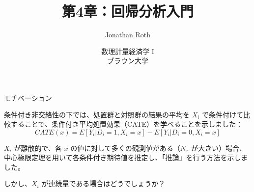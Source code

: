 \documentclass[11pt,handout]{beamer}
\newenvironment{wideitemize}{\itemize\addtolength{\itemsep}{10pt}}{\enditemize}
\begin{document}
	
	\begin{frame}[noframenumbering]{}
		\vspace{0.5cm}
		\title[]{第4章：回帰分析入門}
		\author{Jonathan Roth}
		\date{数理計量経済学 I \\ ブラウン大学\\} 
		\titlepage {\small{}\ }\thispagestyle{empty} \vspace{-30pt}
		
	\end{frame}

	
\begin{frame} {モチベーション}

\begin{wideitemize}

\item
条件付き非交絡性の下では、処置群と対照群の結果の平均を $X_i$ で条件付けて比較することで、条件付き平均処置効果（CATE）を学べることを示しました：
$$ CATE(x) = E[ Y_i | D_i = 1 , X_i = x ] - E[Y_i | D_i = 0 ,X_i =x ]$$ 

\item
$X_i$ が離散的で、各 $x$ の値に対して多くの観測値がある（$N_x$ が大きい）場合、中心極限定理を用いて各条件付き期待値を推定し、「推論」を行う方法を示しました。

\pause
\item
しかし、$X_i$ が連続量である場合はどうでしょうか？

\end{wideitemize}
	
\end{frame}	
\end{document}
